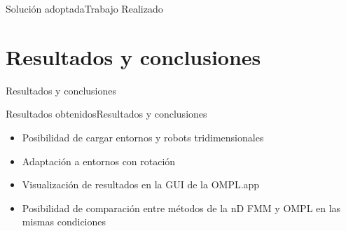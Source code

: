 \documentclass[10pt]{beamer}
\begin{document}
\begin{frame}{Solución adoptada}{Trabajo Realizado}
\vfill

\noindent{}
\vspace{0.4cm}
\noindent{}
\end{frame}


\section{Resultados y conclusiones}

\begin{frame}
\begin{center}
\vspace{1.5cm}
\huge Resultados y conclusiones
\end{center}
\end{frame}

\begin{frame}{Resultados obtenidos}{Resultados y conclusiones}
	\begin{itemize}
		\item Posibilidad de cargar entornos y robots tridimensionales
		\item Adaptación a entornos con rotación
		\item Visualización de resultados en la GUI de la OMPL.app
		\item Posibilidad de comparación entre métodos de la nD FMM y OMPL en las mismas condiciones
	\end{itemize}
\end{frame}
\end{document}
